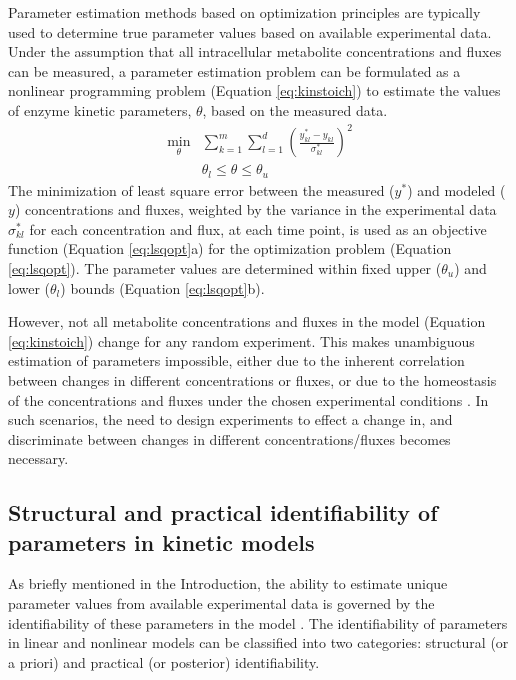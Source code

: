 \documentclass[10pt]{article}
\begin{document}
	Parameter estimation methods based on optimization principles are typically used to determine true parameter values based on available experimental data. Under the assumption that all intracellular metabolite concentrations and fluxes can be measured, a parameter estimation problem can be formulated as a nonlinear programming problem (Equation \ref{eq:kinstoich}) to estimate the values of enzyme kinetic parameters, $\theta$, based on the measured data. 
	\begin{subequations}\label{eq:lsqopt}
		\begin{align}
		\underset{\theta}{\mathrm{min}} &\sum_{k=1}^{m}\sum_{l=1}^{d}\left(\frac{y_{kl}^*-y_{kl}}{\sigma_{kl}^*}\right)^2\\
		&\theta_l \le \theta \le \theta_u
		\end{align}
	\end{subequations}	
	The minimization of least square error between the measured ($y^*$) and modeled ($y$) concentrations and fluxes, weighted by the variance in the experimental data $\sigma_{kl}^*$ for each concentration and flux, at each time point, is used as an objective function (Equation \ref{eq:lsqopt}a) for the optimization problem (Equation \ref{eq:lsqopt}). The parameter values are determined within fixed upper ($\theta_u$) and lower ($\theta_l$) bounds (Equation \ref{eq:lsqopt}b). 
	
	However, not all metabolite concentrations and fluxes in the model (Equation \ref{eq:kinstoich}) change for any random experiment. This makes unambiguous estimation of parameters impossible, either due to the inherent correlation between changes in different concentrations or fluxes, or due to the homeostasis of the concentrations and fluxes under the chosen experimental conditions \parencite{Heijnen2013}. In such scenarios, the need to design experiments to effect a change in, and discriminate between changes in different concentrations/fluxes becomes necessary. 
	
	\subsection{Structural and practical identifiability of parameters in kinetic models}	
	As briefly mentioned in the Introduction, the ability to estimate unique parameter values from available experimental data is governed by the identifiability of these parameters in the model \parencite{Ljung1994,Vanlier2012,Berthoumieux2013,Raue2014}. The identifiability of parameters in linear and nonlinear models can be classified into two categories: structural (or a priori) and practical (or posterior) identifiability.
	
\end{document}
